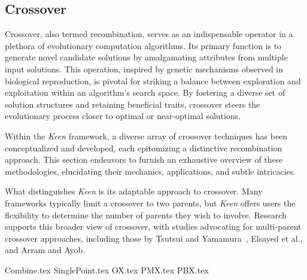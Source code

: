 \subsection{Crossover}
\label{sec:keen:op:cx}
  Crossover, also termed recombination, serves as an indispensable operator in 
  a plethora of evolutionary computation algorithms. Its primary function is to 
  generate novel candidate solutions by amalgamating attributes from multiple 
  input solutions. This operation, inspired by genetic mechanisms observed in 
  biological reproduction, is pivotal for striking a balance between 
  exploration and exploitation within an algorithm's search space. By fostering 
  a diverse set of solution structures and retaining beneficial traits, 
  crossover steers the evolutionary process closer to optimal or near-optimal 
  solutions.

  Within the \textit{Keen} framework, a diverse array of crossover techniques 
  has been conceptualized and developed, each epitomizing a distinctive 
  recombination approach. This section endeavors to furnish an exhaustive 
  overview of these methodologies, elucidating their mechanics, applications, 
  and subtle intricacies.

  What distinguishes \textit{Keen} is its adaptable approach to crossover. Many 
  frameworks typically limit a crossover to two parents, but \textit{Keen} 
  offers users the flexibility to determine the number of parents they wish to 
  involve. Research supports this broader view of crossover, with 
  studies advocating for multi-parent crossover approaches, including those by 
  Tsutsui and Yamamura~\autocite{tsutsuiMultiparentRecombinationSimplex1999}, 
  Elsayed et al.\autocite{elsayedGANewMultiparent2011}, and Arram and 
  Ayob\autocite{arramNovelMultiparentOrder2019}.
  
  {Combine.tex}
  {SinglePoint.tex}
  {OX.tex}
  {PMX.tex}
  {PBX.tex}
  